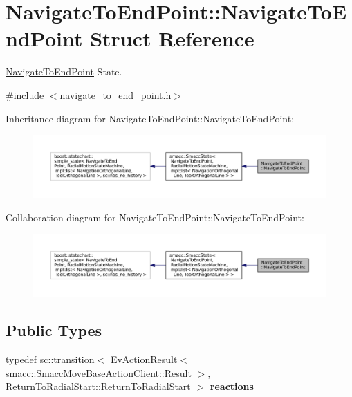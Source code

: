 \hypertarget{structNavigateToEndPoint_1_1NavigateToEndPoint}{}\section{Navigate\+To\+End\+Point\+:\+:Navigate\+To\+End\+Point Struct Reference}
\label{structNavigateToEndPoint_1_1NavigateToEndPoint}


\hyperlink{structNavigateToEndPoint_1_1NavigateToEndPoint}{Navigate\+To\+End\+Point} State.  




{\ttfamily \#include $<$navigate\+\_\+to\+\_\+end\+\_\+point.\+h$>$}



Inheritance diagram for Navigate\+To\+End\+Point\+:\+:Navigate\+To\+End\+Point\+:
\nopagebreak
\begin{figure}[H]
\begin{center}
\leavevmode
\includegraphics[width=350pt]{structNavigateToEndPoint_1_1NavigateToEndPoint__inherit__graph}
\end{center}
\end{figure}


Collaboration diagram for Navigate\+To\+End\+Point\+:\+:Navigate\+To\+End\+Point\+:
\nopagebreak
\begin{figure}[H]
\begin{center}
\leavevmode
\includegraphics[width=350pt]{structNavigateToEndPoint_1_1NavigateToEndPoint__coll__graph}
\end{center}
\end{figure}
\subsection*{Public Types}
\begin{DoxyCompactItemize}
\item 
typedef sc\+::transition$<$ \hyperlink{structsmacc_1_1EvActionResult}{Ev\+Action\+Result}$<$ smacc\+::\+Smacc\+Move\+Base\+Action\+Client\+::\+Result $>$, \hyperlink{structReturnToRadialStart_1_1ReturnToRadialStart}{Return\+To\+Radial\+Start\+::\+Return\+To\+Radial\+Start} $>$ {\bfseries reactions}\hypertarget{structNavigateToEndPoint_1_1NavigateToEndPoint_abc30168c31735908f4b06db0b2742762}{}\label{structNavigateToEndPoint_1_1NavigateToEndPoint_abc30168c31735908f4b06db0b2742762}

\end{DoxyCompactItemize}
